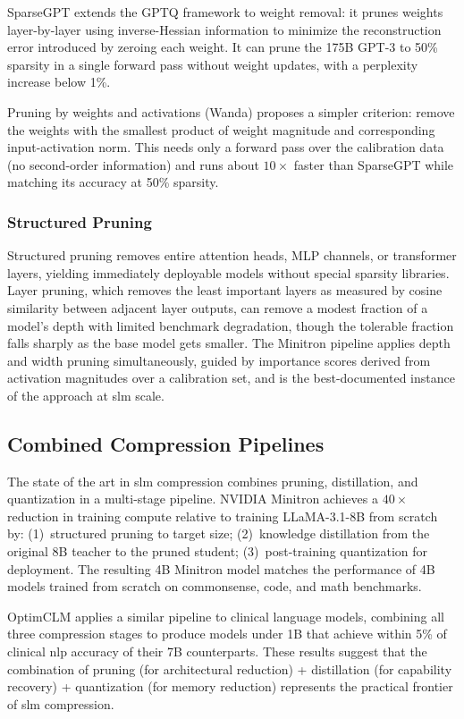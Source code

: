 SparseGPT \citep{frantar2023sparsegpt} extends the GPTQ framework to weight removal: it prunes weights layer-by-layer using inverse-Hessian information to minimize the reconstruction error introduced by zeroing each weight. It can prune the 175B GPT-3 to 50\% sparsity in a single forward pass without weight updates, with a perplexity increase below 1\%.

Pruning by weights and activations (Wanda) \citep{sun2024wanda} proposes a simpler criterion: remove the weights with the smallest product of weight magnitude and corresponding input-activation norm. This needs only a forward pass over the calibration data (no second-order information) and runs about $10\times$ faster than SparseGPT while matching its accuracy at 50\% sparsity.

\subsubsection{Structured Pruning}

Structured pruning removes entire attention heads, MLP channels, or transformer layers, yielding immediately deployable models without special sparsity libraries. Layer pruning, which removes the least important layers as measured by cosine similarity between adjacent layer outputs, can remove a modest fraction of a model's depth with limited benchmark degradation, though the tolerable fraction falls sharply as the base model gets smaller. The Minitron pipeline \citep{minitron2024} applies depth and width pruning simultaneously, guided by importance scores derived from activation magnitudes over a calibration set, and is the best-documented instance of the approach at \gls{slm} scale.

\subsection{Combined Compression Pipelines}
\label{subsec:compression_combined}

The state of the art in \gls{slm} compression combines pruning, distillation, and quantization in a multi-stage pipeline. NVIDIA Minitron \citep{minitron2024} achieves a $40\times$ reduction in training compute relative to training LLaMA-3.1-8B from scratch by: (1)~structured pruning to target size; (2)~knowledge distillation from the original 8B teacher to the pruned student; (3)~post-training quantization for deployment. The resulting 4B Minitron model matches the performance of 4B models trained from scratch on commonsense, code, and math benchmarks.

OptimCLM \citep{hasan2024optimclm} applies a similar pipeline to clinical language models, combining all three compression stages to produce models under 1B that achieve within 5\% of clinical \gls{nlp} accuracy of their 7B counterparts. These results suggest that the combination of pruning (for architectural reduction) + distillation (for capability recovery) + quantization (for memory reduction) represents the practical frontier of \gls{slm} compression.

